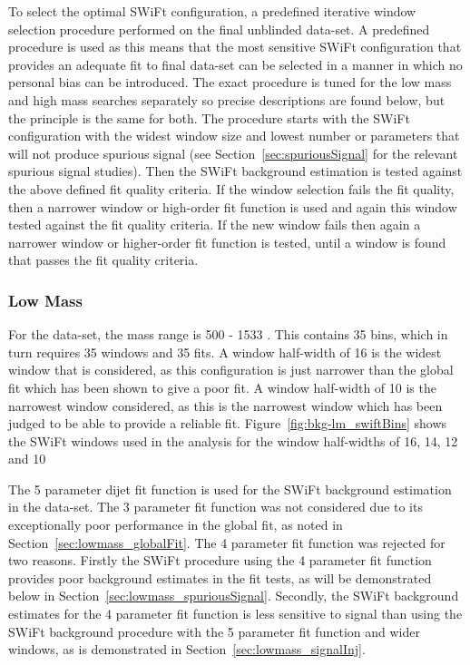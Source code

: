To select the optimal SWiFt configuration, a predefined iterative window selection procedure performed on the final unblinded data-set.
A predefined procedure is used as this means that the most sensitive SWiFt configuration that provides an adequate fit to final data-set can be selected
in a manner in which no personal bias can be introduced.
The exact procedure is tuned for the low mass and high mass searches separately so precise descriptions are found below,
but the principle is the same for both.
The procedure starts with the SWiFt configuration with the widest window size and lowest number or parameters that will not produce spurious signal
(see Section~\ref{sec:spuriousSignal} for the relevant spurious signal studies).
Then the SWiFt background estimation is tested against the above defined fit quality criteria.
If the window selection fails the fit quality, then a narrower window or high-order fit function is used and again this window tested against the fit quality criteria.
If the new window fails then again a narrower window or higher-order fit function is tested, until a window is found that passes the fit quality criteria.


\subsubsection{Low Mass}
\label{sec:lowmass_windowSel}

For the \lm{} data-set, the mass range is 500 - 1533 \GeV{}. This contains 35 bins, which in turn requires 35 windows and 35 fits.
A window half-width of 16 is  the widest window that is considered,
as this configuration is just narrower than the global fit which has been shown to give a poor fit.
A window half-width of 10 is the narrowest window considered,
as this is the narrowest window which has been judged to be able to provide a reliable fit.
Figure~\ref{fig:bkg-lm_swiftBins} shows the SWiFt windows used in the \lm{} analysis for the window half-widths of 16, 14, 12 and 10

The 5 parameter dijet fit function is used for the SWiFt background estimation in the \lm{} data-set.
The 3 parameter fit function was not considered due to its exceptionally poor performance in the global fit, as noted in Section~\ref{sec:lowmass_globalFit}.
The 4 parameter fit function was rejected for two reasons.
Firstly the SWiFt procedure using the 4 parameter fit function provides poor background estimates in the fit tests,
as will be demonstrated below in Section~\ref{sec:lowmass_spuriousSignal}.
Secondly, the SWiFt background estimates for the 4 parameter fit function is less sensitive to signal than
using the SWiFt background procedure with the 5 parameter fit function and wider windows, as is demonstrated in Section~\ref{sec:lowmass_signalInj}.

